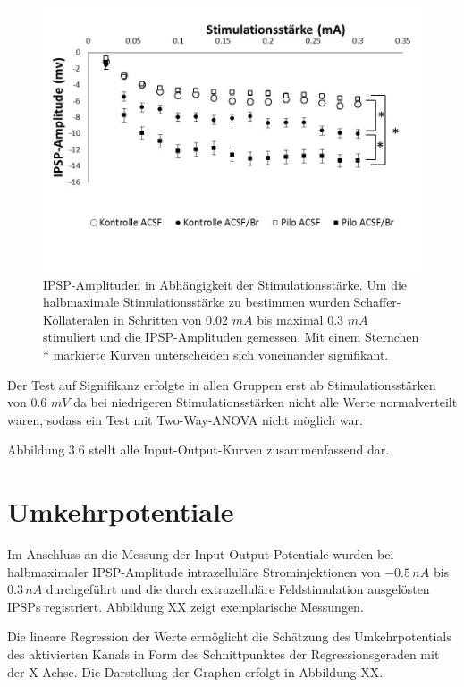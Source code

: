 \documentclass[a4paper,11pt]{report}
\begin{document}
{\begin{figure}[H]
\begin{center}
\includegraphics[width=13cm]{Abbildungen/Inout_Diagramm.jpg}
\caption{IPSP-Amplituden in Abhängigkeit der Stimulationsstärke. Um die halbmaximale Stimulationsstärke zu bestimmen wurden Schaffer-Kollateralen in Schritten von $0.02$ $mA$ bis maximal $0.3$ $mA$ stimuliert und die IPSP-Amplituden gemessen. Mit einem Sternchen * markierte Kurven unterscheiden sich voneinander signifikant. }
\end{center}
\end{figure}

Der Test auf Signifikanz erfolgte in allen Gruppen erst ab Stimulationsstärken von $0.6$ $mV$ da bei niedrigeren Stimulationsstärken nicht alle Werte normalverteilt waren, sodass ein Test mit Two-Way-ANOVA nicht möglich war.

Abbildung 3.6 stellt alle Input-Output-Kurven zusammenfassend dar.

\section{Umkehrpotentiale}

Im Anschluss an die Messung der Input-Output-Potentiale wurden bei halbmaximaler IPSP-Amplitude intrazelluläre Strominjektionen von $-0.5\, nA$ bis $0.3\, nA$ durchgeführt und die durch extrazelluläre Feldstimulation ausgelösten IPSPs registriert. Abbildung XX zeigt exemplarische Messungen.\

Die lineare Regression der Werte ermöglicht die Schätzung des Umkehrpotentials des aktivierten Kanals in Form des Schnittpunktes der Regressionsgeraden mit der X-Achse. Die Darstellung der Graphen erfolgt in Abbildung XX.\\

}
\end{document}
